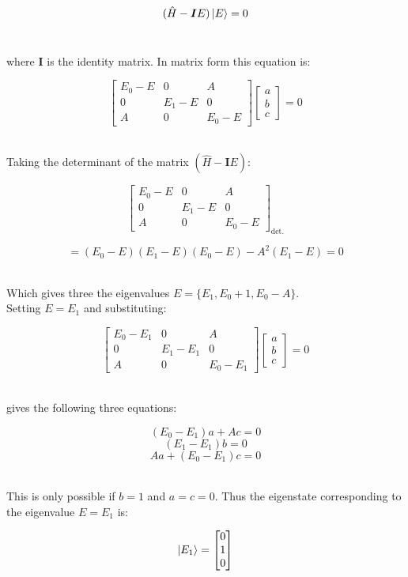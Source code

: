 \documentclass[9pt]{extarticle}
\renewcommand{\v}[1]{{\bm #1}}
\begin{document}
\begin{multicols*}{2}
$$(\hat H - \v I E ) \ket E = 0$$ \ 

where $\v I$ is the identity matrix. In matrix form this equation is: 

$$
\begin{bmatrix}
	E_0 - E & 0 & A \\ 
	0 & E_1 - E & 0 \\ 
	A & 0 & E_0 - E
\end{bmatrix}
\begin{bmatrix} a \\ b \\ c 
\end{bmatrix} = 0
$$ \ 

Taking the determinant of the matrix $(\hat H - \v I E)$: 

$$
\begin{bmatrix}
        E_0 - E & 0 & A \\ 
        0 & E_1 - E & 0 \\ 
        A & 0 & E_0 - E
\end{bmatrix}_{\text{det.}}
$$ 

$$= (E_0 - E)(E_1 - E)(E_0 - E) - A^2 (E_1 - E) = 0$$ \ 

Which gives three the eigenvalues $E = \{ E_1, E_0+1, E_0-A \}$. \\ 

Setting $E = E_1$ and substituting:

$$
\begin{bmatrix}
        E_0 - E_1 & 0 & A \\ 
        0 & E_1 - E_1 & 0 \\ 
        A & 0 & E_0 - E_1
\end{bmatrix}
\begin{bmatrix}
	a \\ b \\ c
\end{bmatrix}
=0
$$ \ 

gives the following three equations: 

$$(E_0 - E_1)a + Ac = 0$$
$$(E_1 - E_1)b = 0$$
$$Aa + (E_0-E_1)c = 0$$ \ 

This is only possible if $b = 1$ and $a = c = 0$. Thus the eigenstate corresponding to the eigenvalue $E = E_1$ is:

$$\ket{E_1} = \begin{bmatrix}
        0 \\ 1 \\ 0
\end{bmatrix}
$$ \ 


\end{multicols*}
\end{document}
